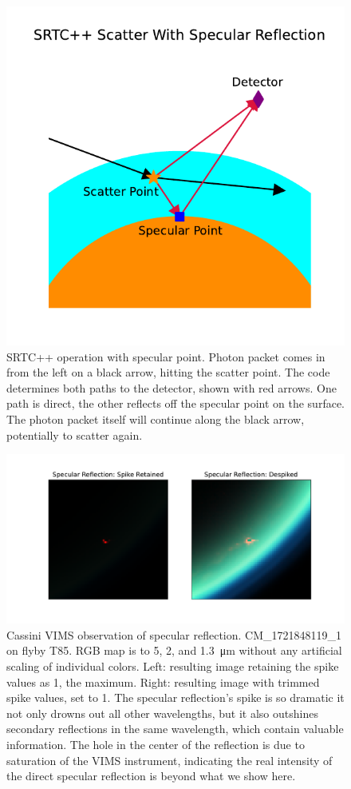 \documentclass{article}
\begin{document}
\begin{figure}[htbp]
\includegraphics[scale = 0.55]{SRTCSpec.pdf}
\centering
\caption{SRTC++ operation with specular point. Photon packet comes in from the left on a black arrow, hitting the scatter point. The code determines both paths to the detector, shown with red arrows. One path is direct, the other reflects off the specular point on the surface. The photon packet itself will continue along the black arrow, potentially to scatter again.}
\label{fig:2}
\end{figure}

\begin{figure}[htbp]
\includegraphics[scale = 0.5]{SpecSpikeNoSpike.pdf}
\centering
\caption{Cassini VIMS observation of specular reflection. CM\_1721848119\_1 on flyby T85. RGB map is to 5, 2, and \qty{1.3}{\micro\meter} without any artificial scaling of individual colors. Left: resulting image retaining the spike values as 1, the maximum. Right: resulting image with trimmed spike values, set to 1. The specular reflection's spike is so dramatic it not only drowns out all other wavelengths, but it also outshines secondary reflections in the same wavelength, which contain valuable information. The hole in the center of the reflection is due to saturation of the VIMS instrument, indicating the real intensity of the direct specular reflection is beyond what we show here.}
\label{fig:3}
\end{figure}
\end{document}
